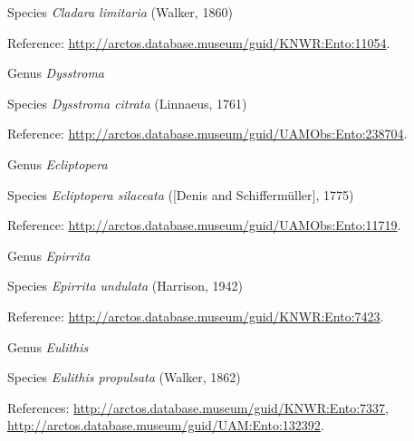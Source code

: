 \documentclass[9pt, article]{memoir}
\begin{document}
\begin{multicols}{2}
\vspace{6pt}\noindent\hspace{36pt}Species \textit{Cladara limitaria} (Walker, 1860)


\vspace{6pt}Reference: 
\url{http://arctos.database.museum/guid/KNWR:Ento:11054}.

\vspace{6pt}\noindent\hspace{30pt}Genus \textit{Dysstroma}


\vspace{6pt}\noindent\hspace{36pt}Species \textit{Dysstroma citrata} (Linnaeus, 1761)


\vspace{6pt}Reference: 
\url{http://arctos.database.museum/guid/UAMObs:Ento:238704}.

\vspace{6pt}\noindent\hspace{30pt}Genus \textit{Ecliptopera}


\vspace{6pt}\noindent\hspace{36pt}Species \textit{Ecliptopera silaceata} ([Denis and Schiffermüller], 1775)


\vspace{6pt}Reference: 
\url{http://arctos.database.museum/guid/UAMObs:Ento:11719}.

\vspace{6pt}\noindent\hspace{30pt}Genus \textit{Epirrita}


\vspace{6pt}\noindent\hspace{36pt}Species \textit{Epirrita undulata} (Harrison, 1942)


\vspace{6pt}Reference: 
\url{http://arctos.database.museum/guid/KNWR:Ento:7423}.

\vspace{6pt}\noindent\hspace{30pt}Genus \textit{Eulithis}


\vspace{6pt}\noindent\hspace{36pt}Species \textit{Eulithis propulsata} (Walker, 1862)


\vspace{6pt}References: 
\url{http://arctos.database.museum/guid/KNWR:Ento:7337}, 
\url{http://arctos.database.museum/guid/UAM:Ento:132392}.


\end{multicols}
\end{document}
